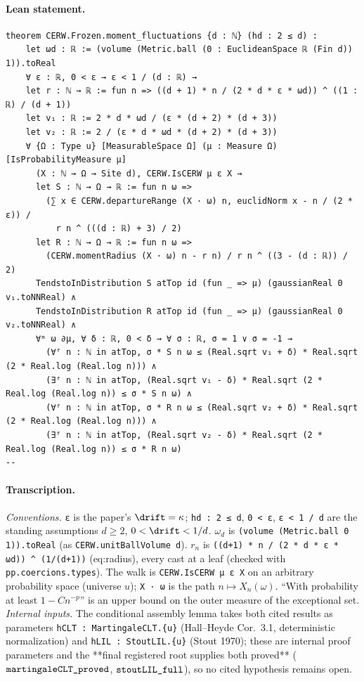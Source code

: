 \paragraph{Lean statement.}
\begin{verbatim}
theorem CERW.Frozen.moment_fluctuations {d : ℕ} (hd : 2 ≤ d) :
    let ωd : ℝ := (volume (Metric.ball (0 : EuclideanSpace ℝ (Fin d)) 1)).toReal
    ∀ ε : ℝ, 0 < ε → ε < 1 / (d : ℝ) →
    let r : ℕ → ℝ := fun n => ((d + 1) * n / (2 * d * ε * ωd)) ^ ((1 : ℝ) / (d + 1))
    let v₁ : ℝ := 2 * d * ωd / (ε * (d + 2) * (d + 3))
    let v₂ : ℝ := 2 / (ε * d * ωd * (d + 2) * (d + 3))
    ∀ {Ω : Type u} [MeasurableSpace Ω] (μ : Measure Ω) [IsProbabilityMeasure μ]
      (X : ℕ → Ω → Site d), CERW.IsCERW μ ε X →
      let S : ℕ → Ω → ℝ := fun n ω =>
        (∑ x ∈ CERW.departureRange (X · ω) n, euclidNorm x - n / (2 * ε)) /
          r n ^ (((d : ℝ) + 3) / 2)
      let R : ℕ → Ω → ℝ := fun n ω =>
        (CERW.momentRadius (X · ω) n - r n) / r n ^ ((3 - (d : ℝ)) / 2)
      TendstoInDistribution S atTop id (fun _ => μ) (gaussianReal 0 v₁.toNNReal) ∧
      TendstoInDistribution R atTop id (fun _ => μ) (gaussianReal 0 v₂.toNNReal) ∧
      ∀ᵐ ω ∂μ, ∀ δ : ℝ, 0 < δ → ∀ σ : ℝ, σ = 1 ∨ σ = -1 →
        (∀ᶠ n : ℕ in atTop, σ * S n ω ≤ (Real.sqrt v₁ + δ) * Real.sqrt (2 * Real.log (Real.log n))) ∧
        (∃ᶠ n : ℕ in atTop, (Real.sqrt v₁ - δ) * Real.sqrt (2 * Real.log (Real.log n)) ≤ σ * S n ω) ∧
        (∀ᶠ n : ℕ in atTop, σ * R n ω ≤ (Real.sqrt v₂ + δ) * Real.sqrt (2 * Real.log (Real.log n))) ∧
        (∃ᶠ n : ℕ in atTop, (Real.sqrt v₂ - δ) * Real.sqrt (2 * Real.log (Real.log n)) ≤ σ * R n ω)
--
\end{verbatim}
\paragraph{Transcription.}
\emph{Conventions.} \verb!ε! is the paper's $\drift=\kappa$; \verb!hd : 2 ≤ d!, \verb!0 < ε!, \verb!ε < 1 / d! are the standing assumptions $d\ge2$, $0<\drift<1/d$. $\omega_d$ is \verb!(volume (Metric.ball 0 1)).toReal! (as \verb!CERW.unitBallVolume d!). $r_n$ is \verb!((d+1) * n / (2 * d * ε * ωd)) ^ (1/(d+1))! (eq:radius), every cast at a leaf (checked with \verb!pp.coercions.types!). The walk is \verb!CERW.IsCERW μ ε X! on an arbitrary probability space (universe $u$); \verb!X · ω! is the path $n\mapsto X_n(\omega)$. ``With probability at least $1-Cn^{-p}$'' is an upper bound on the outer measure of the exceptional set. \emph{Internal inputs.} The conditional assembly lemma takes both cited results as parameters \verb!hCLT : MartingaleCLT.{u}! (Hall--Heyde Cor.~3.1, deterministic normalization) and \verb!hLIL : StoutLIL.{u}! (Stout 1970); these are internal proof parameters and the **final registered root supplies both proved** ($\verb!martingaleCLT_proved!$, $\verb!stoutLIL_full!$), so no cited hypothesis remains open.
